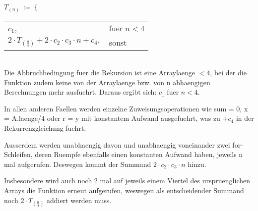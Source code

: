 $T_(n)\ :=\ \bigg\{$
\begin{tabular}{ll}
$c_1$, &fuer $n < 4$\\
$2 \cdot T_(\frac{n}{4}) + 2 \cdot c_2 \cdot c_3 \cdot n + c_4,$ &sonst
\end{tabular}\\


Die Abbruchbedingung fuer die Rekursion ist eine Arraylaenge $< 4$, bei der die Funktion zudem keine von der Arraylaenge bzw. von n abhaengigen Berechnungen mehr ausfuehrt. Daraus ergibt sich: $c_1$ fuer $n < 4$.

In allen anderen Faellen werden einzelne Zuweisungsoperationen wie sum = 0, x = A.laenge/4 oder r = y mit konstantem Aufwand ausgefuehrt, was zu $+ c_4$ in der Rekurrenzgleichung fuehrt.

Ausserdem werden unabhaengig davon und unabhaengig voneinander zwei for-Schleifen, deren Ruempfe ebenfalls einen konstanten Aufwand haben, jeweils n mal aufgerufen. Deswegen kommt der Summand $2 \cdot c_2 \cdot c_3 \cdot n$ hinzu.

Insbesondere wird auch noch 2 mal auf jeweils einem Viertel des urspruenglichen Arrays die Funktion erneut aufgerufen, weswegen als entscheidender Summand noch $2 \cdot T_(\frac{n}{4})$ addiert werden muss.